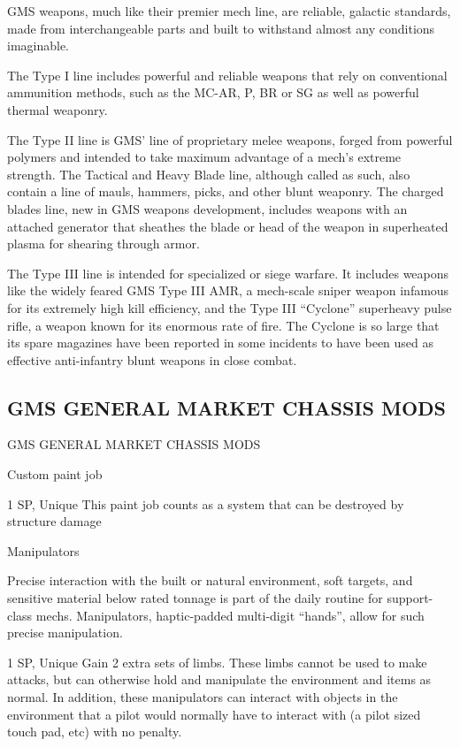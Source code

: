 GMS weapons, much like their premier mech line, are reliable, galactic standards, made from  
interchangeable parts and built to withstand almost any conditions imaginable.
 

The Type I line includes powerful and reliable weapons that rely on conventional ammunition  
methods, such as the MC-AR, P, BR or SG as well as powerful thermal weaponry.
 

The Type II line is GMS’ line of proprietary melee weapons, forged from powerful polymers and  
intended to take maximum advantage of a mech’s extreme strength. The Tactical and Heavy  
Blade line, although called as such, also contain a line of mauls, hammers, picks, and other blunt  
weaponry. The charged blades line, new in GMS weapons development, includes weapons with  
an attached generator that sheathes the blade or head of the weapon in superheated plasma for  
shearing through armor. 
 

The Type III line is intended for specialized or siege warfare. It includes weapons like the widely  
feared GMS Type III AMR, a mech-scale sniper weapon infamous for its extremely high kill  
efficiency, and the Type III “Cyclone” superheavy pulse rifle, a weapon known for its enormous  
rate of fire. The Cyclone is so large that its spare magazines have been reported in some  
incidents to have been used as effective anti-infantry blunt weapons in close combat.
 
\subsection{GMS GENERAL MARKET CHASSIS MODS}
                       GMS GENERAL MARKET CHASSIS MODS
 

Custom paint job
 
1 SP, Unique  
This paint job counts as a system that can be destroyed by structure damage
 

Manipulators  

                                                                                                             


Precise interaction with the built or natural environment, soft targets, and sensitive material below rated  
tonnage is part of the daily routine for support-class mechs. Manipulators, haptic-padded multi-digit  
“hands”, allow for such precise manipulation.   

1 SP, Unique  
Gain 2 extra sets of limbs. These limbs cannot be used to make attacks, but can otherwise hold  
and manipulate the environment and items as normal. In addition, these manipulators can  
interact with objects in the environment that a pilot would normally have to interact with (a pilot  
sized touch pad, etc) with no penalty.
 

